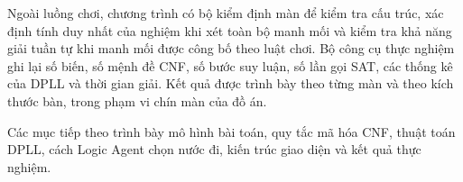 Ngoài luồng chơi, chương trình có bộ kiểm định màn để kiểm tra cấu trúc,
xác định tính duy nhất của nghiệm khi xét toàn bộ manh mối và kiểm tra
khả năng giải tuần tự khi manh mối được công bố theo luật chơi. Bộ công
cụ thực nghiệm ghi lại số biến, số mệnh đề CNF, số bước suy luận, số lần
gọi SAT, các thống kê của DPLL và thời gian giải. Kết quả được trình bày
theo từng màn và theo kích thước bàn, trong phạm vi chín màn của đồ án.

Các mục tiếp theo trình bày mô hình bài toán, quy tắc mã hóa CNF,
thuật toán DPLL, cách Logic Agent chọn nước đi, kiến trúc giao diện và
kết quả thực nghiệm.
